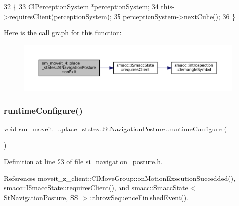 \begin{DoxyCode}
32             \{
33                 ClPerceptionSystem *perceptionSystem;
34                 this->\hyperlink{classsmacc_1_1ISmaccState_a7f95c9f0a6ea2d6f18d1aec0519de4ac}{requiresClient}(perceptionSystem);
35                 perceptionSystem->nextCube();
36             \}
\end{DoxyCode}
Here is the call graph for this function\+:
\nopagebreak
\begin{figure}[H]
\begin{center}
\leavevmode
\includegraphics[width=350pt]{structsm__moveit__4_1_1place__states_1_1StNavigationPosture_a1e0072ec1475de6876feebc591a0acce_cgraph}
\end{center}
\end{figure}
\mbox{\label{structsm__moveit__4_1_1place__states_1_1StNavigationPosture_aaf8ca02fa5a8185baf6bfc55731b1926}} 
\subsubsection{\texorpdfstring{runtime\+Configure()}{runtimeConfigure()}}
{\footnotesize\ttfamily void sm\+\_\+moveit\+\_\+::place\+\_\+states\+::\+St\+Navigation\+Posture\+::runtime\+Configure (\begin{DoxyParamCaption}{ }\end{DoxyParamCaption})\hspace{0.3cm}{\ttfamily [inline]}}



Definition at line 23 of file st\+\_\+navigation\+\_\+posture.\+h.



References moveit\+\_\+z\+\_\+client\+::\+Cl\+Move\+Group\+::on\+Motion\+Execution\+Succedded(), smacc\+::\+I\+Smacc\+State\+::requires\+Client(), and smacc\+::\+Smacc\+State$<$ St\+Navigation\+Posture, S\+S $>$\+::throw\+Sequence\+Finished\+Event().


